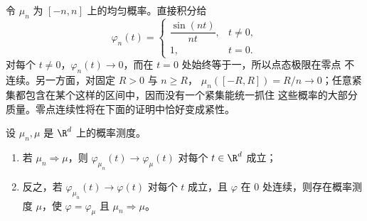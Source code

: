\begin{example}[零点处不连续的极限]\label{ex:5-4-3-3}
令 $\mu_n$ 为 $[-n,n]$ 上的均匀概率。直接积分给
\[
 \varphi_n(t)=
 \begin{cases}
  \dfrac{\sin(nt)}{nt},&t\ne0,\\[5pt]
  1,&t=0.
 \end{cases}
\]
对每个 $t\ne0$，$\varphi_n(t)\to0$，而在 $t=0$ 处始终等于一，所以点态极限在零点
不连续。另一方面，对固定 $R>0$ 与 $n\geq R$，
$\mu_n([-R,R])=R/n\to0$；任意紧集都包含在某个这样的区间中，因而没有一个紧集能统一抓住
这些概率的大部分质量。零点连续性将在下面的证明中恰好变成紧性。
\end{example}

\begin{theorem}\label{theorem:5-4-3-3}
设 $\mu_n,\mu$ 是 $\R^d$ 上的概率测度。
\begin{enumerate}
 \item 若 $\mu_n\Rightarrow\mu$，则
 $\varphi_{\mu_n}(t)\to\varphi_\mu(t)$ 对每个 $t\in\R^d$ 成立；
 \item 反之，若 $\varphi_{\mu_n}(t)\to\varphi(t)$ 对每个 $t$ 成立，且
 $\varphi$ 在 $0$ 处连续，则存在概率测度 $\mu$，使
 $\varphi=\varphi_\mu$ 且 $\mu_n\Rightarrow\mu$。
\end{enumerate}
\end{theorem}

